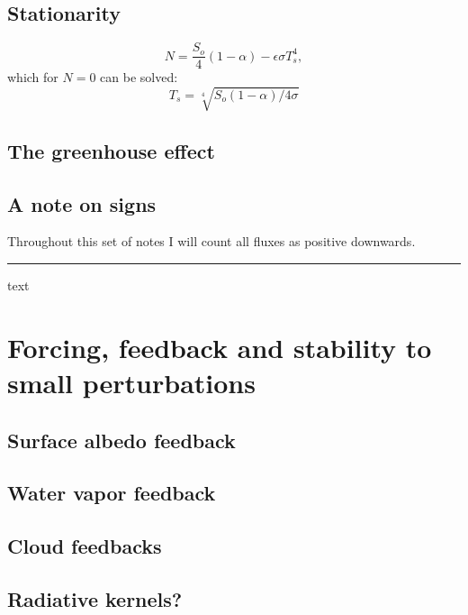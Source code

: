 \documentclass[12pt]{book}
\begin{document}
\section{Stationarity}


\begin{equation}
N = \frac{S_o}{4}(1-\alpha) - \epsilon \sigma T_s^4,
\end{equation}
\noindent which for $N=0$ can be solved:
\begin{equation}
T_s = \sqrt[4]{S_o(1-\alpha)/4\sigma}
\end{equation}



\section{The greenhouse effect}

\section{A note on signs}
Throughout this set of notes I will count all fluxes as positive downwards. 

\vspace{1 cm}
{\setlength{\parindent}{0cm}
\hrule
\begin{exercise}
text
\end{exercise}
}

\chapter{Forcing, feedback and stability to small perturbations}

\section{Surface albedo feedback}
\section{Water vapor feedback}
\section{Cloud feedbacks}
\section{Radiative kernels?}

\end{document}
